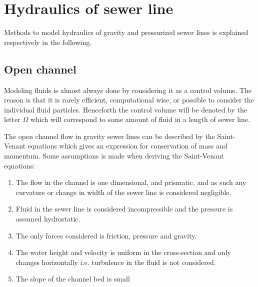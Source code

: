 \section{Hydraulics of sewer line}\label{se:hydraulics_of_sewer_line}
Methods to model hydraulics of gravity and pressurized sewer lines is explained respectively in the following. 


\subsection{Open channel}\label{subse:open_channel}
Modeling fluids is almost always done by considering it as a control volume. The reason is that it is rarely efficient, computational wise, or possible to consider the individual fluid particles.
Henceforth the control volume will be denoted by the letter $\Omega$ which will correspond to some amount of fluid in a length of sewer line.		

The open channel flow in gravity sewer lines can be described by the Saint-Venant equations which gives an expression for conservation of mass and momentum.
Some assumptions is made when deriving the Saint-Venant equations:

\begin{table}[H]
\begin{enumerate}
\item The flow in the channel is one dimensional, and prismatic, and as such any curvature or change in width of the sewer line is considered negligible.
\item Fluid in the sewer line is considered incompressible and the pressure is assumed hydrostatic.
\item The only forces considered is friction, pressure and gravity.
\item The water height and velocity is uniform in the cross-section and only changes horizontally i.e. turbulence in the fluid is not considered.
\item The slope of the channel bed is small
\end{enumerate}
\label{tab:saintbernard_assumptions}
\end{table}

